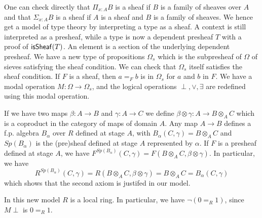     \medskip

    One can check directly that $\Pi_{x:A}B$ is a sheaf if $B$ is a family of sheaves over $A$
    and that $\Sigma_{x:A}B$ is a sheaf if $A$ is a sheaf and $B$ is a family of sheaves. We hence get a model of type theory
    by interpreting a type as a sheaf. A context is still interpreted as a presheaf, while a type is now a dependent presheaf $T$
    with a proof of $\mathsf{isSheaf}(T)$. An element is a section of the underlying dependent presheaf.
    We have a new type of propositions $\Omega_s$ which is the subpresheaf of $\Omega$ of sieves satisfying the sheaf condition.
    We can check that $\Omega_s$ itself satisfies the sheaf condition. If $F$ is a sheaf, then $a =_F b$ is in $\Omega_s$
    for $a$ and $b$ in $F$. We have a modal operation $M:\Omega\rightarrow \Omega_s$, and the logical operations $\perp,\vee,\exists$
    are redefined using this modal operation.

    \medskip

    If we have two maps $\beta:A\rightarrow B$ and $\gamma:A\rightarrow C$ we define
    $\beta\otimes\gamma:A \rightarrow B\otimes_AC$ which is a coproduct in the category of maps of domain $A$.
    Any map $A\rightarrow B$ defines a f.p. algebra $B_{\alpha}$ over $R$ defined at stage $A$, with
    $B_{\alpha}(C,\gamma) = B\otimes_A C$ and $Sp(B_{\alpha})$ is
    the (pre)sheaf defined at stage $A$ represented by $\alpha$.
    If $F$ is a presheaf defined at stage $A$, we have $F^{Sp(B_{\alpha})}(C,\gamma) = F(B\otimes_A C,\beta\otimes\gamma)$.
    In particular, we have
    $$R^{Sp(B_{\alpha})}(C,\gamma) = R(B\otimes_A C,\beta\otimes\gamma) = B\otimes_A C = B_{\alpha}(C,\gamma)$$
    which shows that the second axiom is justifed in our model.


    In this new model $R$ is a local ring.
    In particular, we have $\neg (0 =_R 1)$, since $M\perp$ is $0 =_R 1$.
    
